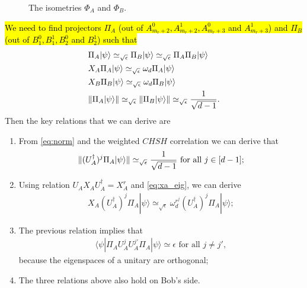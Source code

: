 \documentclass[11pt,letterpaper]{article}
\newcommand{\ket}[1]{|#1\rangle}
\newcommand{\bra}[1]{\langle#1|}
\newcommand{\ct}{^{\dagger}}
\DeclarePairedDelimiter{\norm}{\lVert}{\rVert}
\newcommand{\1}{\mathbb{1}}
\newcommand{\EPR}[1]{EPR^{(#1)}}
\newcommand{\appd}[1]{\simeq_{#1}}
\theoremstyle{definition}
\begin{document}
\begin{figure}[H]
	\caption{The isometries $\Phi_A$ and $\Phi_B$.}
\end{figure}
\hl{We need to find projectors $\Pi_A$ (out of $A_{m_r+2}^0, A_{m_r+2}^1, A_{m_r+3}^0$ and $A_{m_r+3}^1$) and $\Pi_B$ 
(out of $B_1^0, B_1^1, B_2^0$ and $B_2^1$) such that}
\begin{align}
	\label{eq:piapib}&\Pi_A \ket{\psi} \appd{\sqrt{\epsilon}} \Pi_B \ket{\psi} \appd{\sqrt{\epsilon}} \Pi_A \Pi_B \ket{\psi} \\
	\label{eq:xa_eig} &X_A \Pi_A \ket{\psi} \appd{\sqrt{\epsilon}} \omega_d \Pi_A \ket{\psi} \\
	\label{eq:xb_eig} &X_B \Pi_B \ket{\psi} \appd{\sqrt{\epsilon}} \omega_d \Pi_B \ket{\psi} \\
	\label{eq:norm} &\norm{\Pi_A \ket{\psi}} \appd{\sqrt{\epsilon}} \norm{\Pi_B \ket{\psi}}  \appd{\sqrt{\epsilon}} \frac{1}{\sqrt{d-1}}.
\end{align}
Then the key relations that we can derive are
\begin{enumerate}
	\item From \cref{eq:norm} and the weighted $CHSH$ correlation we can derive that 
	\begin{align}
	\norm{(U_A\ct)^j \Pi_A \ket{\psi}} \appd{\sqrt{\epsilon}} \frac{1}{\sqrt{d-1}} \text{ for all } j \in [d-1];
	\end{align}
	\item Using relation $U_AX_AU_A\ct = X_A^r$ and \cref{eq:xa_eig}, we can derive
	\begin{align}
	X_A (U_A\ct)^j \Pi_A \ket{\psi} \appd{\sqrt{\epsilon}} \omega_d^{r^j} (U_A\ct)^j \Pi_A\ket{\psi};
	\end{align}
	\item The previous relation implies that 
	\begin{align}
	\bra{\psi} \Pi_A U_A^j U_A^{j'} \Pi_A \ket{\psi} \simeq \epsilon \text{ for all }j \neq j',
	\end{align}
	because the eigenspaces of a unitary are orthogonal;
	\item The three relations above also hold on Bob's side.
\end{enumerate}
\end{document}
